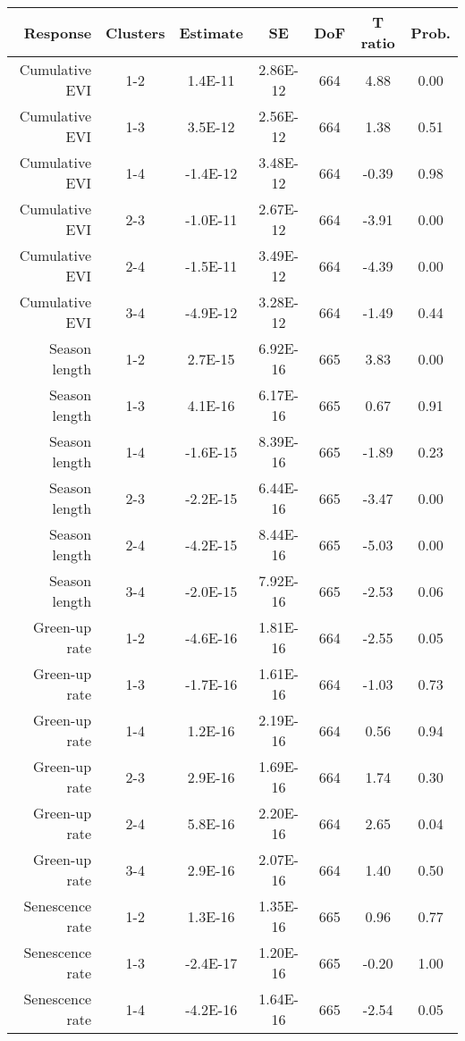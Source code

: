 \begin{table}[H]
\centering
\begin{tabular}{rcccccc}
  \hline
Response & Clusters & Estimate & SE & DoF & T ratio & Prob. \\ 
  \hline
Cumulative EVI & 1-2 & 1.4E-11 & 2.86E-12 & 664 & 4.88 & 0.00 \\ 
  Cumulative EVI & 1-3 & 3.5E-12 & 2.56E-12 & 664 & 1.38 & 0.51 \\ 
  Cumulative EVI & 1-4 & -1.4E-12 & 3.48E-12 & 664 & -0.39 & 0.98 \\ 
   \hline
Cumulative EVI & 2-3 & -1.0E-11 & 2.67E-12 & 664 & -3.91 & 0.00 \\ 
  Cumulative EVI & 2-4 & -1.5E-11 & 3.49E-12 & 664 & -4.39 & 0.00 \\ 
  Cumulative EVI & 3-4 & -4.9E-12 & 3.28E-12 & 664 & -1.49 & 0.44 \\ 
   \hline
Season length & 1-2 & 2.7E-15 & 6.92E-16 & 665 & 3.83 & 0.00 \\ 
  Season length & 1-3 & 4.1E-16 & 6.17E-16 & 665 & 0.67 & 0.91 \\ 
  Season length & 1-4 & -1.6E-15 & 8.39E-16 & 665 & -1.89 & 0.23 \\ 
   \hline
Season length & 2-3 & -2.2E-15 & 6.44E-16 & 665 & -3.47 & 0.00 \\ 
  Season length & 2-4 & -4.2E-15 & 8.44E-16 & 665 & -5.03 & 0.00 \\ 
  Season length & 3-4 & -2.0E-15 & 7.92E-16 & 665 & -2.53 & 0.06 \\ 
   \hline
Green-up rate & 1-2 & -4.6E-16 & 1.81E-16 & 664 & -2.55 & 0.05 \\ 
  Green-up rate & 1-3 & -1.7E-16 & 1.61E-16 & 664 & -1.03 & 0.73 \\ 
  Green-up rate & 1-4 & 1.2E-16 & 2.19E-16 & 664 & 0.56 & 0.94 \\ 
   \hline
Green-up rate & 2-3 & 2.9E-16 & 1.69E-16 & 664 & 1.74 & 0.30 \\ 
  Green-up rate & 2-4 & 5.8E-16 & 2.20E-16 & 664 & 2.65 & 0.04 \\ 
  Green-up rate & 3-4 & 2.9E-16 & 2.07E-16 & 664 & 1.40 & 0.50 \\ 
  Senescence rate & 1-2 & 1.3E-16 & 1.35E-16 & 665 & 0.96 & 0.77 \\ 
  Senescence rate & 1-3 & -2.4E-17 & 1.20E-16 & 665 & -0.20 & 1.00 \\ 
  Senescence rate & 1-4 & -4.2E-16 & 1.64E-16 & 665 & -2.54 & 0.05 \\ 

\end{tabular}
\end{table}
